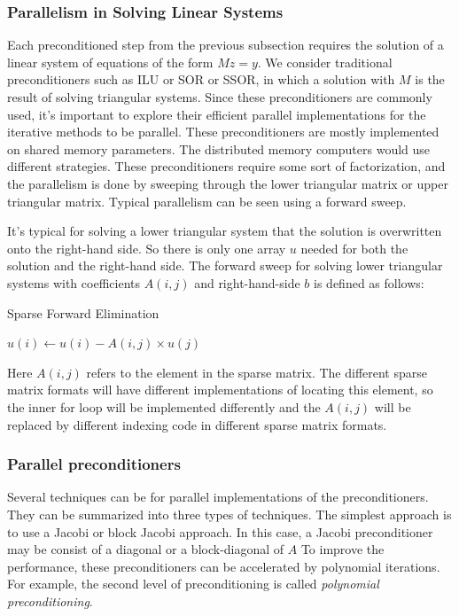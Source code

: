 \subsubsection{Parallelism in Solving Linear Systems}
Each preconditioned step from the previous subsection requires the solution of a linear system of equations of the form $Mz = y$. We consider traditional preconditioners such as ILU or SOR or SSOR, in which a solution with $M$ is the result of solving triangular systems. Since these preconditioners are commonly used, it's important to explore their efficient parallel implementations for the iterative methods to be parallel. These preconditioners are mostly implemented on shared memory parameters. The distributed memory computers would use different strategies. These preconditioners require some sort of factorization, and the parallelism is done by sweeping through the lower triangular matrix or upper triangular matrix. Typical parallelism can be seen using a forward sweep. 

It's typical for solving a lower triangular system that the solution is overwritten onto the right-hand side. So there is only one array $u$ needed for both the solution and the right-hand side. The forward sweep for solving lower triangular systems with coefficients $A(i,j)$ and right-hand-side $b$ is defined as follows:
\begin{algorithm}
\caption{Sparse Forward Elimination}\label{alg:two}
\begin{algorithmic}[1]
            \State $u(i) \gets u(i) - A(i,j) \times u(j)$
        \EndFor
    \EndFor
\end{algorithmic}
\end{algorithm}

Here $A(i,j)$ refers to the element in the sparse matrix. The different sparse matrix formats will have different implementations of locating this element, so the inner for loop will be implemented differently and the $A(i,j)$ will be replaced by different indexing code in different sparse matrix formats.

\subsubsection{Parallel preconditioners}
Several techniques can be for parallel implementations of the preconditioners. They can be summarized into three types of techniques.
The simplest approach is to use a Jacobi or block Jacobi approach. In this case, a Jacobi preconditioner may be consist of a diagonal or a block-diagonal of $A$
To improve the performance, these preconditioners can be accelerated by polynomial iterations. For example, the second level of preconditioning is called \textit{polynomial preconditioning}.

